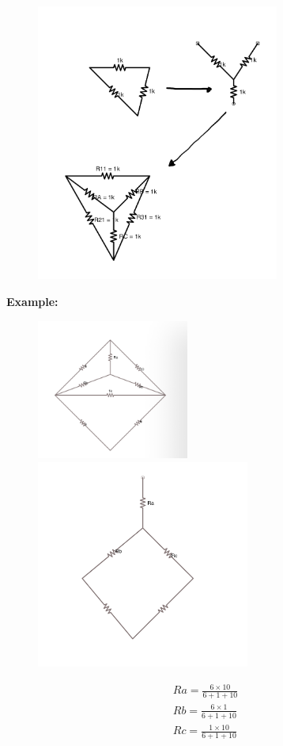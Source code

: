 \documentclass[a4paper,12]{article}
\begin{document}
\begin{figure}[H]
	\centering
	\includegraphics[width=80mm]{Image/IMG_96ACB9C21676-1.jpeg}
\end{figure}
\textbf{Example:}
\begin{figure}[H]
	\centering
	\includegraphics[width=50mm]{Image/IMG_BE86518E1F99-1.jpeg}
	\includegraphics[width=70mm]{Image/IMG_58FAB4CBE3EB-1.jpeg}
\end{figure}
\begin{gather}
	Ra=\frac{6\times 10}{6+1+10}\\
	Rb=\frac{6\times 1}{6+1+10}\\
	Rc=\frac{1\times 10}{6+1+10}
\end{gather}
\end{document}
